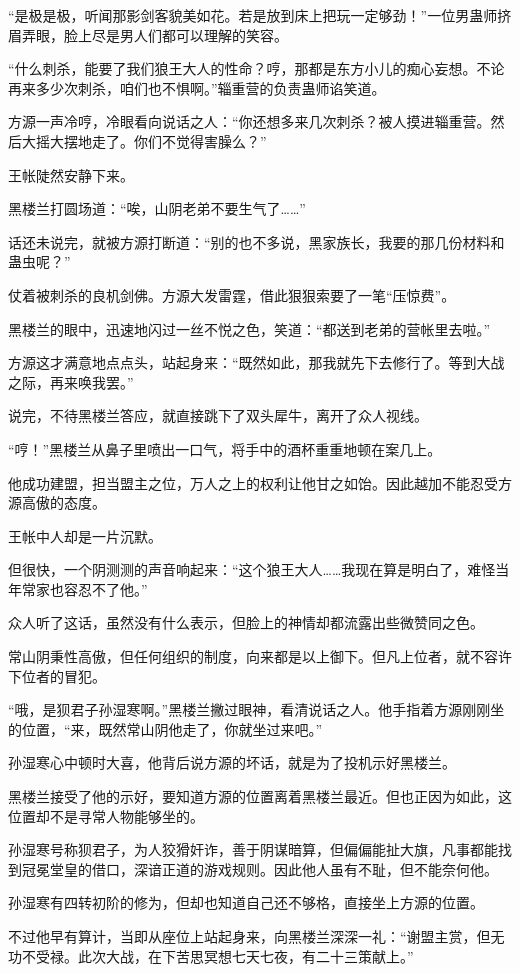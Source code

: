 \begin{this_body}
“是极是极，听闻那影剑客貌美如花。若是放到床上把玩一定够劲！”一位男蛊师挤眉弄眼，脸上尽是男人们都可以理解的笑容。

“什么刺杀，能要了我们狼王大人的性命？哼，那都是东方小儿的痴心妄想。不论再来多少次刺杀，咱们也不惧啊。”辎重营的负责蛊师谄笑道。

方源一声冷哼，冷眼看向说话之人：“你还想多来几次刺杀？被人摸进辎重营。然后大摇大摆地走了。你们不觉得害臊么？”

王帐陡然安静下来。

黑楼兰打圆场道：“唉，山阴老弟不要生气了……”

话还未说完，就被方源打断道：“别的也不多说，黑家族长，我要的那几份材料和蛊虫呢？”

仗着被刺杀的良机剑佛。方源大发雷霆，借此狠狠索要了一笔“压惊费”。

黑楼兰的眼中，迅速地闪过一丝不悦之色，笑道：“都送到老弟的营帐里去啦。”

方源这才满意地点点头，站起身来：“既然如此，那我就先下去修行了。等到大战之际，再来唤我罢。”

说完，不待黑楼兰答应，就直接跳下了双头犀牛，离开了众人视线。

“哼！”黑楼兰从鼻子里喷出一口气，将手中的酒杯重重地顿在案几上。

他成功建盟，担当盟主之位，万人之上的权利让他甘之如饴。因此越加不能忍受方源高傲的态度。

王帐中人却是一片沉默。

但很快，一个阴测测的声音响起来：“这个狼王大人……我现在算是明白了，难怪当年常家也容忍不了他。”

众人听了这话，虽然没有什么表示，但脸上的神情却都流露出些微赞同之色。

常山阴秉性高傲，但任何组织的制度，向来都是以上御下。但凡上位者，就不容许下位者的冒犯。

“哦，是狈君子孙湿寒啊。”黑楼兰撇过眼神，看清说话之人。他手指着方源刚刚坐的位置，“来，既然常山阴他走了，你就坐过来吧。”

孙湿寒心中顿时大喜，他背后说方源的坏话，就是为了投机示好黑楼兰。

黑楼兰接受了他的示好，要知道方源的位置离着黑楼兰最近。但也正因为如此，这位置却不是寻常人物能够坐的。

孙湿寒号称狈君子，为人狡猾奸诈，善于阴谋暗算，但偏偏能扯大旗，凡事都能找到冠冕堂皇的借口，深谙正道的游戏规则。因此他人虽有不耻，但不能奈何他。

孙湿寒有四转初阶的修为，但却也知道自己还不够格，直接坐上方源的位置。

不过他早有算计，当即从座位上站起身来，向黑楼兰深深一礼：“谢盟主赏，但无功不受禄。此次大战，在下苦思冥想七天七夜，有二十三策献上。”


\end{this_body}
